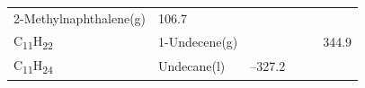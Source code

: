\documentclass[
]{book}
\theoremstyle{definition}
\theoremstyle{definition}
\theoremstyle{definition}
\theoremstyle{remark}
\begin{document}
\begin{longtable}[]{@{}llllll@{}}
\begin{minipage}[t]{0.17\columnwidth}
2-Methylnaphthalene(g)\strut
\end{minipage} & \begin{minipage}[t]{0.15\columnwidth}\raggedright
106.7\strut
\end{minipage} & \begin{minipage}[t]{0.15\columnwidth}\raggedright
\strut
\end{minipage} & \begin{minipage}[t]{0.14\columnwidth}\raggedright
\strut
\end{minipage} & \begin{minipage}[t]{0.14\columnwidth}\raggedright
\strut
\end{minipage}\tabularnewline
\begin{minipage}[t]{0.07\columnwidth}\raggedright
C\textsubscript{11}H\textsubscript{22}\strut
\end{minipage} & \begin{minipage}[t]{0.17\columnwidth}\raggedright
1-Undecene(g)\strut
\end{minipage} & \begin{minipage}[t]{0.15\columnwidth}\raggedright
\strut
\end{minipage} & \begin{minipage}[t]{0.15\columnwidth}\raggedright
\strut
\end{minipage} & \begin{minipage}[t]{0.14\columnwidth}\raggedright
\strut
\end{minipage} & \begin{minipage}[t]{0.14\columnwidth}\raggedright
344.9\strut
\end{minipage}\tabularnewline
\begin{minipage}[t]{0.07\columnwidth}\raggedright
C\textsubscript{11}H\textsubscript{24}\strut
\end{minipage} & \begin{minipage}[t]{0.17\columnwidth}\raggedright
Undecane(l)\strut
\end{minipage} & \begin{minipage}[t]{0.15\columnwidth}\raggedright
--327.2\strut
\end{minipage} & \begin{minipage}[t]{0.15\columnwidth}\raggedright
\strut
\end{minipage} & \begin{minipage}[t]{0.14\columnwidth}\raggedright
\strut
\end{minipage} & \begin{minipage}[t]{0.14\columnwidth}\raggedright

\end{minipage}
\end{longtable}
\end{document}
